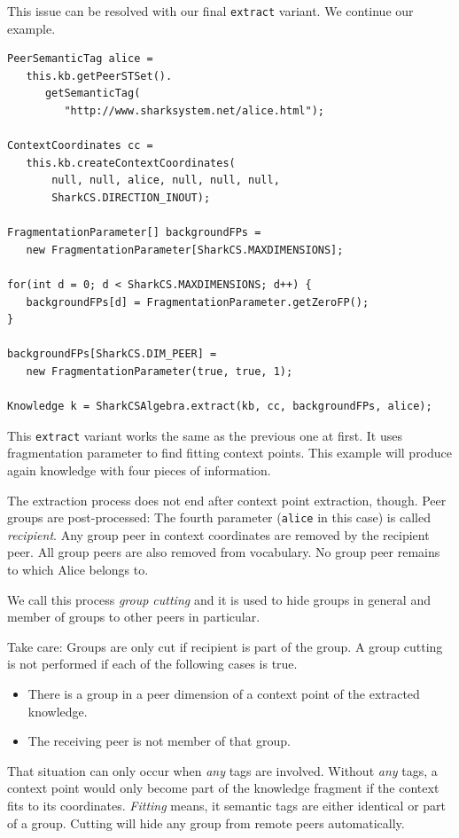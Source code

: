 This issue can be resolved with our final {\tt extract} variant. We continue our example.

\begin{verbatim}
PeerSemanticTag alice =
   this.kb.getPeerSTSet().
      getSemanticTag(
         "http://www.sharksystem.net/alice.html");

ContextCoordinates cc =
   this.kb.createContextCoordinates(
       null, null, alice, null, null, null,
       SharkCS.DIRECTION_INOUT);

FragmentationParameter[] backgroundFPs =
   new FragmentationParameter[SharkCS.MAXDIMENSIONS];

for(int d = 0; d < SharkCS.MAXDIMENSIONS; d++) {
   backgroundFPs[d] = FragmentationParameter.getZeroFP();
}

backgroundFPs[SharkCS.DIM_PEER] =
   new FragmentationParameter(true, true, 1);

Knowledge k = SharkCSAlgebra.extract(kb, cc, backgroundFPs, alice);
\end{verbatim}

This {\tt extract} variant works the same as the previous one at first. It uses fragmentation parameter to find fitting context points. This example will produce again knowledge with four pieces of information.

The extraction process does not end after context point extraction, though. Peer groups are post-processed: The fourth parameter ({\tt alice} in this case) is called {\it recipient}. Any group peer in context coordinates are removed by the recipient peer. All group peers are also removed from vocabulary. No group peer remains to which Alice belongs to.

We call this process {\it group cutting} and it is used to hide groups in general and member of groups to other peers in particular.

Take care: Groups are only cut if recipient is part of the group. A group cutting is not performed if each of the following cases is true.

\begin{itemize}
\item
There is a group in a peer dimension of a context point of the extracted knowledge.

\item
The receiving peer is not member of that group.
\end{itemize}

That situation can only occur when {\it any} tags are involved. Without {\it any} tags, a context point would only become part of the knowledge fragment if the context fits to its coordinates. {\it Fitting} means, it semantic tags are either identical or part of a group. Cutting will hide any group from remote peers automatically.

